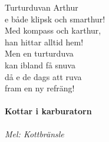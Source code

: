 \documentclass[12pt]{article}
\begin{document}
\begin{minipage}{0.45\textwidth}
	Turturduvan Arthur\\
	e både klipsk och smarthur!\\
	Med kompass och karthur,\\
	han hittar alltid hem!\\
	
	
	Men en turturduva\\
	kan ibland få snuva\\
	då e de dags att ruva\\
	fram en ny refräng!\\
\end{minipage}


\newpage


\noindent
\begin{minipage}{0.45\textwidth}
	\paragraph*{Kottar i karburatorn\\}
	\vspace{3px}
	\textit{Mel: Kottbränsle}\\
\end{minipage}
\end{document}
